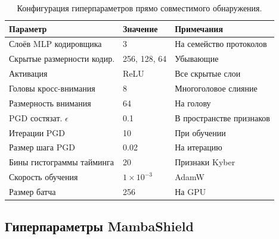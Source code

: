 \begin{table}[htbp]
\centering
\caption{Конфигурация гиперпараметров прямо совместимого обнаружения.}
\label{tab:hp_pqidps}
\begin{tabular}{lll}
\toprule
Параметр & Значение & Примечания \\
\midrule
Слоёв MLP кодировщика      & 3     & На семейство протоколов \\
Скрытые размерности кодир.  & 256, 128, 64 & Убывающие \\
Активация                  & ReLU  & Все скрытые слои \\
Головы кросс-внимания      & 8     & Многоголовое слияние \\
Размерность внимания       & 64    & На голову \\
PGD состязат. $\epsilon$   & 0.1   & В пространстве признаков \\
Итерации PGD               & 10    & При обучении \\
Размер шага PGD            & 0.02  & На итерацию \\
Бины гистограммы тайминга  & 20    & Признаки Kyber \\
Скорость обучения          & $1\times10^{-3}$ & AdamW \\
Размер батча               & 256   & На GPU \\
\bottomrule
\end{tabular}
\end{table}


\subsection{Гиперпараметры MambaShield}
\label{app:hp_mamba}

